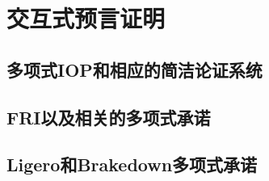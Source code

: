 \chapter{交互式预言证明}\label{chp:10IOP}

\section{多项式IOP和相应的简洁论证系统}\label{10.2}
\section{FRI以及相关的多项式承诺}\label{10.4}
\section{Ligero和Brakedown多项式承诺}\label{10.5}